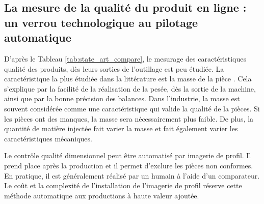 \subsection{La mesure de la qualité du produit en ligne : un verrou technologique au pilotage automatique}

D'après le Tableau \ref{tab:state_art_compare}, le mesurage des caractéristiques qualité des produits, dès leurs sorties de l'outillage est peu étudiée.
La caractéristique la plus étudiée dans la littérature est la masse de la pièce \cite{schnerr-haselbarth_automation_2000, fournier_conduite_2006, michaeli_online_2009}.
Cela s'explique par la facilité de la réalisation de la pesée, dès la sortie de la machine, ainsi que par la bonne précision des balances.
Dans l'industrie, la masse est souvent considérée comme une caractéristique qui valide la qualité de la pièces.
Si les pièces ont des manques, la masse sera nécessairement plus faible.
De plus, la quantité de matière injectée fait varier la masse et fait également varier les caractéristiques mécaniques.

Le contrôle qualité dimensionnel peut être automatisé par imagerie de profil.
Il prend place après la production et il permet d'exclure les pièces non conformes.
En pratique, il est généralement réalisé par un humain à l'aide d'un comparateur.
Le coût et la complexité de l'installation de l'imagerie de profil réserve cette méthode automatique aux productions à haute valeur ajoutée.

